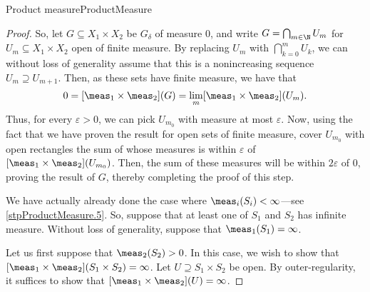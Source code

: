 \begin{thm}{Product measure}{ProductMeasure}
\begin{proof}
So, let $G\subseteq X_1\times X_2$ be $G_{\delta}$ of measure $0$, and write $G=\bigcap _{m\in \N}U_m$ for $U_m\subseteq X_1\times X_2$ open of finite measure.  By replacing $U_m$ with $\bigcap _{k=0}^mU_k$, we can without loss of generality assume that this is a nonincreasing sequence $U_m\supseteq U_{m+1}$.  Then, as these sets have finite measure, we have that
\begin{equation}
0=[\meas _1\times \meas _2](G)=\lim _m[\meas _1\times \meas _2](U_m).
\end{equation}
Thus, for every $\varepsilon >0$, we can pick $U_{m_0}$ with measure at most $\varepsilon$.  Now, using the fact that we have proven the result for open sets of finite measure, cover $U_{m_0}$ with open rectangles the sum of whose measures is within $\varepsilon$ of $[\meas _1\times \meas _2](U_{m_0})$.  Then, the sum of these measures will be within $2\varepsilon$ of $0$, proving the result of $G$, thereby completing the proof of this step.

We have actually already done the case where $\meas _i(S_i)<\infty$---see \cref{stpProductMeasure.5}. So, suppose that at least one of $S_1$ and $S_2$ has infinite measure.  Without loss of generality, suppose that $\meas _1(S_1)=\infty$.

Let us first suppose that $\meas _2(S_2)>0$.  In this case, we wish to show that $[\meas _1\times \meas _2](S_1\times S_2)=\infty$.  Let $U\supseteq S_1\times S_2$ be open.  By outer-regularity, it suffices to show that $[\meas _1\times \meas _2](U)=\infty$.


\end{proof}
\end{thm}
